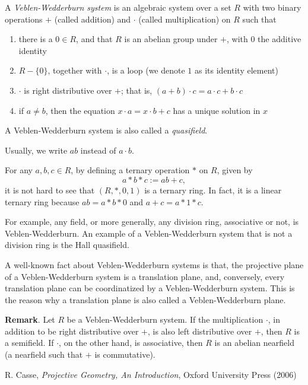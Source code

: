 \documentclass[12pt]{article}
\begin{document}
A \emph{Veblen-Wedderburn system} is an algebraic system over a set $R$ with two binary operations $+$ (called addition) and $\cdot$ (called multiplication) on $R$ such that
\begin{enumerate}
\item there is a $0\in R$, and that $R$ is an abelian group under $+$, with $0$ the additive identity
\item $R-\lbrace 0\rbrace$, together with $\cdot$, is a loop (we denote $1$ as its identity element)
\item $\cdot$ is right distributive over $+$; that is, $(a+b)\cdot c=a\cdot c+ b\cdot c$
\item if $a\ne b$, then the equation $x\cdot a=x\cdot b+c$ has a unique solution in $x$
\end{enumerate}

A Veblen-Wedderburn system is also called a \emph{quasifield}.

Usually, we write $ab$ instead of $a\cdot b$.

For any $a,b,c\in R$, by defining a ternary operation $*$ on $R$, given by $$a*b*c:=a b+c,$$ it is not hard to see that $(R,*,0,1)$ is a ternary ring.  In fact, it is a linear ternary ring because $ab=a*b*0$ and $a+c=a*1*c$.

For example, any field, or more generally, any division ring, associative or not, is Veblen-Wedderburn.  An example of a Veblen-Wedderburn system that is not a division ring is the Hall quasifield.

A well-known fact about Veblen-Wedderburn systems is that, the projective plane of a Veblen-Wedderburn system is a translation plane, and, conversely, every translation plane can be coordinatized by a Veblen-Wedderburn system.  This is the reason why a translation plane is also called a Veblen-Wedderburn plane.

\textbf{Remark}.  Let $R$ be a Veblen-Wedderburn system.  If the multiplication $\cdot$, in addition to be right distributive over $+$, is also left distributive over $+$, then $R$ is a semifield.  If $\cdot$, on the other hand, is associative, then $R$ is an abelian nearfield (a nearfield such that $+$ is commutative).

\begin{thebibliography}{7}
 R. Casse, {\it Projective Geometry, An Introduction}, Oxford University Press (2006)
\end{thebibliography}
\end{document}
